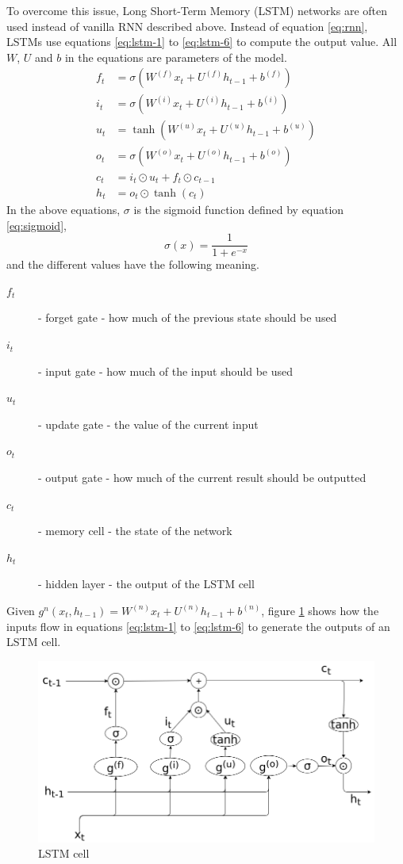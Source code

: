To overcome this issue, Long Short-Term Memory (LSTM) networks
\cite{Hochreiter:1997:LSM:1246443.1246450} are often used instead of vanilla RNN
described above. Instead of equation \ref{eq:rnn}, LSTMs use equations
\ref{eq:lstm-1} to \ref{eq:lstm-6} to compute the output value. All $W$, $U$ and
$b$ in the equations are parameters of the model.
\begin{align}
  f_t &= \sigma \left( W^{(f)}x_t + U^{(f)}h_{t - 1} + b^{(f)} \right) \label{eq:lstm-1}\\
  i_t &= \sigma \left( W^{(i)}x_t + U^{(i)}h_{t - 1} + b^{(i)} \right)\\
  u_t &= \tanh \left( W^{(u)}x_t + U^{(u)}h_{t - 1} + b^{(u)} \right)\\
  o_t &= \sigma \left( W^{(o)}x_t + U^{(o)}h_{t - 1} + b^{(o)} \right)\\
  c_t &= i_t \odot u_t + f_t \odot c_{t - 1}\\
  h_t &= o_t \odot \tanh(c_t) \label{eq:lstm-6}
\end{align}
In the above equations, $\sigma$ is the sigmoid function defined by equation
\ref{eq:sigmoid},
\begin{equation}
  \sigma(x) = \frac{1}{1 + e^{-x}} \label{eq:sigmoid}
\end{equation}
and the different values have the following meaning.
\begin{description}
\item[$f_t$] - forget gate - how much of the previous state should be used
\item[$i_t$] - input gate - how much of the input should be used
\item[$u_t$] - update gate - the value of the current input
\item[$o_t$] - output gate - how much of the current result should be outputted
\item[$c_t$] - memory cell - the state of the network
\item[$h_t$] - hidden layer - the output of the LSTM cell
\end{description}
Given $g^n(x_t, h_{t-1}) = W^{(n)}x_t + U^{(n)} h_{t-1} + b^{(n)}$, figure
\ref{fig:lstm-cell} shows how the inputs flow in equations \ref{eq:lstm-1} to
\ref{eq:lstm-6} to generate the outputs of an LSTM cell.
\begin{figure}[tb]
  \begin{center}
    \includegraphics[width=14cm]{./images/lstm-cell.png}
    \caption{\label{fig:lstm-cell}LSTM cell}
  \end{center}
\end{figure}
